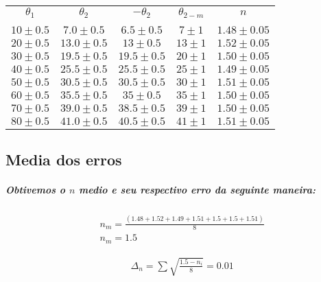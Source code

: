 \documentclass[12pt,twoside, a4paper, twocolumn]{article}
\begin{document}
\begin{center}
  \begin{tabular}{ |c|c|c|c|c| }
    \hline
    $\theta_1$   & $\theta_2$     & $-\theta_2$ & $\theta_{2-m}$  & $n$ \\
                 &                &             &                 &     \\
    $10 \pm 0.5$ & $7.0 \pm 0.5
    $            & $6.5 \pm 0.5$  & $7 \pm 1$   & $1.48 \pm 0.05$       \\
    $20 \pm 0.5$ & $13.0 \pm 0.5
    $            & $13 \pm 0.5$   & $13 \pm 1$  & $1.52 \pm 0.05$       \\
    $30 \pm 0.5$ & $19.5 \pm 0.5
    $            & $19.5 \pm 0.5$ & $ 20 \pm 1$ & $1.50 \pm 0.05$       \\
    $40 \pm 0.5$ & $25.5 \pm 0.5
    $            & $25.5 \pm 0.5$ & $25 \pm 1$  & $1.49 \pm 0.05$       \\
    $50 \pm 0.5$ & $30.5 \pm 0.5
    $            & $30.5 \pm 0.5$ & $ 30 \pm 1$ & $1.51 \pm 0.05$       \\
    $60 \pm 0.5$ & $35.5 \pm 0.5
    $            & $35 \pm 0.5$   & $ 35 \pm 1$ & $1.50 \pm 0.05$       \\
    $70 \pm 0.5$ & $39.0 \pm 0.5
    $            & $38.5 \pm 0.5$ & $ 39 \pm 1$ & $1.50 \pm 0.05$       \\
    $80 \pm 0.5$ & $41.0 \pm 0.5
    $            & $40.5 \pm 0.5$ & $ 41 \pm 1$ & $1.51 \pm 0.05$       \\
    \hline
  \end{tabular}
\end{center}

\subsection{Media dos erros}

\subparagraph*{Obtivemos o $n$ medio e seu respectivo erro da seguinte maneira:}

\begin{equation*}
  \begin{aligned}
     & n_m = \frac{(1.48 + 1.52 + 1.49 + 1.51 + 1.5 + 1.5 + 1.51)}{8} \\
     & n_m = 1.5
  \end{aligned}
\end{equation*}

\begin{equation*}
  \begin{aligned}
     & \varDelta_n = \sum{\sqrt{\frac{1.5 - n_i}{8}}} = 0.01
  \end{aligned}
\end{equation*}
\end{document}
